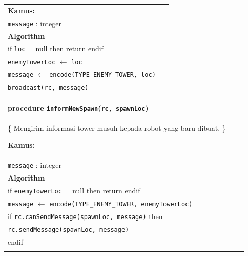 \documentclass{article}
\newenvironment{pseudobox}
{
\centering
\begin{longtable}{|p{0.94\linewidth}|}
\hline
}
{
\\ \hline
\end{longtable}
\vspace{0.05cm}
}
\begin{document}
\begin{enumerate}[label=\alph*.]
\begin{pseudobox}
\textbf{Kamus:} \\
\hspace*{1.5em}\texttt{message} : integer \\

\textbf{Algorithm} \\

\hspace*{1.5em}if \texttt{loc} = null then return endif \\

\hspace*{1.5em}\texttt{enemyTowerLoc} $\leftarrow$ \texttt{loc} \\

\hspace*{1.5em}\texttt{message} $\leftarrow$ \texttt{encode(TYPE\_ENEMY\_TOWER, loc)} \\

\hspace*{1.5em}\texttt{broadcast(rc, message)}
\end{pseudobox}

\begin{pseudobox}
\textbf{procedure \texttt{informNewSpawn}(\texttt{rc, spawnLoc})} \\
\{ Mengirim informasi tower musuh kepada robot yang baru dibuat. \}

\textbf{Kamus:} \\
\hspace*{1.5em}\texttt{message} : integer \\

\textbf{Algorithm} \\

\hspace*{1.5em}if \texttt{enemyTowerLoc} = null then return endif \\

\hspace*{1.5em}\texttt{message} $\leftarrow$ \texttt{encode(TYPE\_ENEMY\_TOWER, enemyTowerLoc)} \\

\hspace*{1.5em}if \texttt{rc.canSendMessage(spawnLoc, message)} then \\
\hspace*{3em}\texttt{rc.sendMessage(spawnLoc, message)} \\
\hspace*{1.5em}endif \\

\end{pseudobox}


\end{enumerate}
\end{document}
